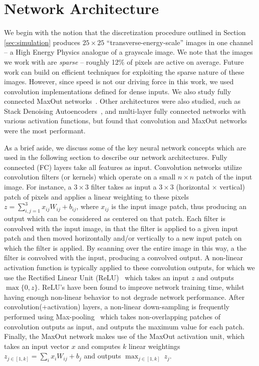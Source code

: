 
\section{Network Architecture}
\label{sec:arch}


We begin with the notion that the discretization procedure outlined in Section \ref{sec:simulation} produces $25\times 25$ ``transverse-energy-scale'' images in one channel -- a High Energy Physics analogue of a grayscale image. We note that the images we work with are \emph{sparse} -- roughly 12\% of pixels are active on average. Future work can build on efficient techniques for exploiting the sparse nature of these images. However, since speed is not our driving force in this work, we used convolution implementations defined for dense inputs.  We also study fully connected MaxOut networks~\cite{maxout:goodfellow}.  Other architectures were also studied, such as Stack Denoising Autoencoders~\cite{SDAE}, and multi-layer fully connected networks with various activation functions, but found that convolution and MaxOut networks were the most performant.

As a brief aside, we discuss some of the key neural network concepts which are used in the following section to describe our network architectures.  Fully connected (FC) layers take all features as input.  Convolution networks utilize convolution filters (or kernels) which operate on a small $n\times n$ patch of the input image.  For instance, a $3\times3$ filter takes as input a $3\times3$ (horizontal $\times$ vertical) patch of pixels and applies a linear weighting to these pixels $z = \sum_{i,j=1}^{3} x_{ij}W_{ij} + b_{ij}$, where $x_{ij}$ is the input image patch, thus producing an output which can be considered as centered on that patch.  Each filter is convolved with the input image, in that the filter is applied to a given input patch and then moved horizontally and/or vertically to a new input patch on which the filter is applied.  By scanning over the entire image in this way, a the filter is convolved with the input, producing a convolved output.  A non-linear activation function is typically applied to these convolution outputs, for which we use the Rectified Linear Unit (ReLU)~\cite{RELU} which takes an input $z$ and outputs $\max\{0,z\}$. ReLU's have been found to improve network training time, whilst having enough non-linear behavior to not degrade network performance.    After convolution(+activation) layers, a non-linear down-sampling is frequently performed using Max-pooling~\cite{MAXPOOL} which takes non-overlapping patches of convolution outputs as input, and outputs the maximum value for each patch.  Finally, the MaxOut network makes use of the MaxOut activation unit, which takes an input vector $x$ and computes $k$ linear weightings $z_{j\in [1,k]} = \sum_{i} x_{i} W_{ij} + b_{j}$ and  outputs $\max_{j\in [1,k]}\ z_{j}$.  

